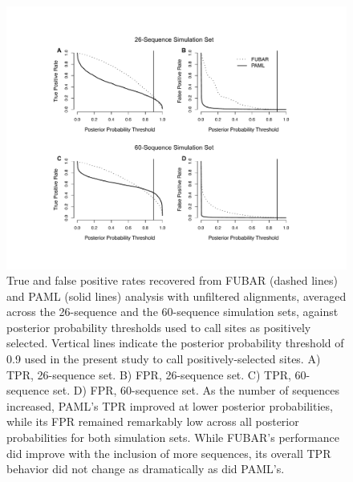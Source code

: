 \documentclass[11pt]{article}
\begin{document}
\begin{figure}[H]
\centerline{\includegraphics[width=5in]{Figures/tprfpr.pdf}}
\caption{\label{tprfpr} True and false positive rates recovered from FUBAR (dashed lines) and PAML (solid lines) analysis with unfiltered alignments, averaged across the 26-sequence and the 60-sequence simulation sets, against posterior probability thresholds used to call sites as positively selected. Vertical lines indicate the posterior probability threshold of 0.9 used in the present study to call positively-selected sites. A) TPR, 26-sequence set. B) FPR, 26-sequence set. C) TPR, 60-sequence set. D) FPR, 60-sequence set.  As the number of sequences increased, PAML's TPR improved at lower posterior probabilities, while its FPR remained remarkably low across all posterior probabilities for both simulation sets. While FUBAR's performance did improve with the inclusion of more sequences, its overall TPR behavior did not change as dramatically as did PAML's.}
\end{figure}

\newpage
\end{document}
